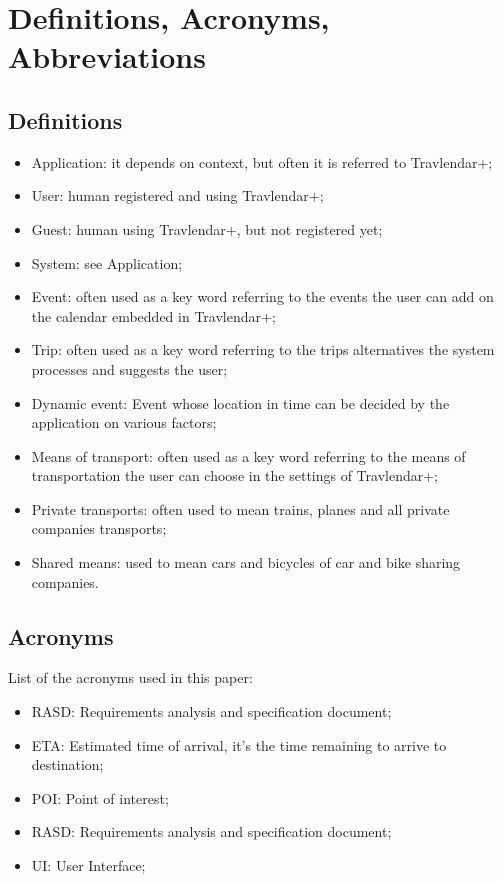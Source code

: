 \section{Definitions, Acronyms, Abbreviations}
%
\subsection{Definitions}
\begin{itemize}
\item Application: it depends on context, but often it is referred to Travlendar+;
\item User: human registered and using Travlendar+;
\item Guest: human using Travlendar+, but not registered yet;
\item System: see Application;
\item Event: often used as a key word referring to the events the user can add on the calendar embedded in Travlendar+;
\item Trip: often used as a key word referring to the trips alternatives the system processes and suggests the user;
\item Dynamic event: Event whose location in time can be decided by the application on various factors;
\item Means of transport: often used as a key word referring to the means of transportation the user can choose in the settings of Travlendar+;
\item Private transports: often used to mean trains, planes and all private companies transports;
\item Shared means: used to mean cars and bicycles of car and bike sharing companies.
\end{itemize}
%
\subsection{Acronyms}
List of the acronyms used in this paper:
\begin{itemize}
\item RASD: Requirements analysis and specification document;
\item ETA: Estimated time of arrival, it's the time remaining to arrive to destination;
\item POI: Point of interest;
\item RASD: Requirements analysis and specification document;
\item UI: User Interface;
\end{itemize}
%
%
